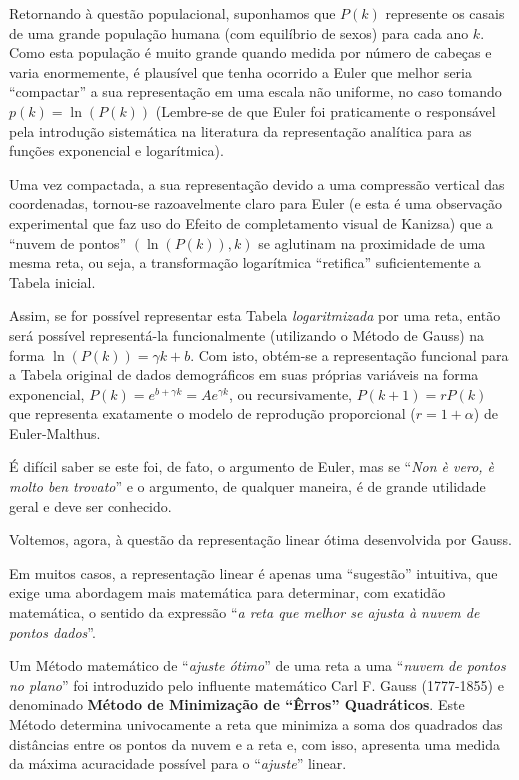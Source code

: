     Retornando à questão populacional, suponhamos que \(P(k)\) represente os casais de uma grande população humana (com equilíbrio de sexos) para cada ano \(k\). Como esta população é muito grande quando medida por número de cabeças e varia enormemente, é plausível que tenha ocorrido a Euler que melhor seria ``compactar'' a sua representação em uma escala não uniforme, no caso tomando \(p(k) = \ln(P(k))\) (Lembre-se de que Euler foi praticamente o responsável pela introdução sistemática na literatura da representação analítica para as funções exponencial e logarítmica).
    
    Uma vez compactada, a sua representação devido a uma compressão vertical das coordenadas, tornou-se razoavelmente claro para Euler (e esta é uma observação experimental que faz uso do Efeito de completamento visual de Kanizsa) que a ``nuvem de pontos'' \((\ln(P(k)), k)\) se aglutinam na proximidade de uma mesma reta, ou seja, a transformação logarítmica ``retifica'' suficientemente a Tabela inicial.

    Assim, se for possível representar esta Tabela \textit{logaritmizada} por uma reta, então será possível representá-la funcionalmente (utilizando o Método de Gauss) na forma \(\ln(P(k)) = \gamma k+b\). Com isto, obtém-se a representação funcional para a Tabela original de dados demográficos em suas próprias variáveis na forma exponencial, \(P(k) = e^{b+\gamma k} = A e^{\gamma k}\), ou recursivamente, \(P(k+1) = r P(k)\) que representa exatamente o modelo de reprodução proporcional (\(r = 1+\alpha\)) de Euler-Malthus.

    É difícil saber se este foi, de fato, o argumento de Euler, mas se ``\textit{Non è vero, è molto ben trovato}'' e o argumento, de qualquer maneira, é de grande utilidade geral e deve ser conhecido.

    Voltemos, agora, à questão da representação linear ótima desenvolvida por Gauss.
    
    Em muitos casos, a representação linear é apenas uma ``sugestão'' intuitiva, que exige uma abordagem mais matemática para determinar, com exatidão matemática, o sentido da expressão ``\textit{a reta que melhor se ajusta à nuvem de pontos dados}''.
    
    Um Método matemático de ``\textit{ajuste ótimo}'' de uma reta a uma ``\textit{nuvem de pontos no plano}'' foi introduzido pelo influente matemático Carl F. Gauss (1777-1855) e denominado \textbf{Método de Minimização de ``Êrros'' Quadráticos}. Este Método determina univocamente a reta que minimiza a soma dos quadrados das distâncias entre os pontos da nuvem e a reta e, com isso, apresenta uma medida da máxima acuracidade possível para o ``\textit{ajuste}'' linear.

